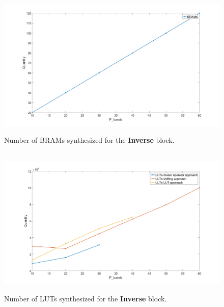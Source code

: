\begin{figure}[H]

\hbox{\hspace*{-1cm}                                                           
   \includegraphics[scale=0.27]{images/syntese_resultat/inverse/brams.png}}
  \caption{Number of BRAMs synthesized for the \textbf{Inverse} block. } 
  \label{fig:brams_inverse}
\end{figure}


\begin{figure}[H]

\hbox{\hspace*{-2cm}                                                           
   \includegraphics[scale=0.3]{images/syntese_resultat/inverse/number_of_luts.png}}
  \caption{Number of LUTs synthesized for the \textbf{Inverse} block. } 
  \label{fig:luts_inverse}
\end{figure}


